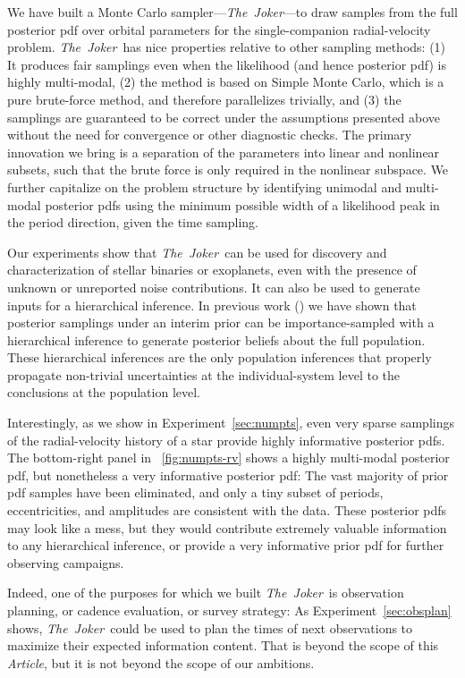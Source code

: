 \documentclass[manuscript, letterpaper]{aastex6}
\newcommand{\project}[1]{\textsl{#1}}
\newcommand{\samplername}{\project{The~Joker}}
\newcommand{\documentname}{\textsl{Article}}
\begin{document}
We have built a Monte Carlo sampler---\samplername---to draw samples from the
full posterior pdf over orbital parameters for the single-companion
radial-velocity problem.
\samplername\ has nice properties relative to other sampling methods:
(1) It produces fair samplings even when the likelihood (and hence posterior
pdf) is highly multi-modal, (2) the method is based on Simple Monte Carlo, which
is a pure brute-force method, and therefore parallelizes trivially, and (3) the
samplings are guaranteed to be correct under the assumptions presented above
without the need for convergence or other diagnostic checks.
The primary innovation we bring is a separation of the parameters into linear
and nonlinear subsets, such that the brute force is only required in the
nonlinear subspace.
We further capitalize on the problem structure by identifying unimodal and
multi-modal posterior pdfs using the minimum possible width of a likelihood peak
in the period direction, given the time sampling.

Our experiments show that \samplername\ can be used for discovery and
characterization of stellar binaries or exoplanets, even with the presence of
unknown or unreported noise contributions.
It can also be used to generate inputs for a hierarchical inference.
In previous work (\citealt{hoggeccentricity, dfmexopop}) we have shown
that posterior samplings under an interim prior can be importance-sampled
with a hierarchical inference to generate posterior beliefs about the
full population.
These hierarchical inferences are the only population inferences
that properly propagate non-trivial uncertainties at the
individual-system level to the conclusions at the population level.

Interestingly, as we show in Experiment~\ref{sec:numpts}, even very sparse
samplings of the radial-velocity history of a star provide highly
informative posterior pdfs.
The bottom-right panel in \figurename~\ref{fig:numpts-rv} shows a highly
multi-modal posterior pdf, but nonetheless a very informative posterior pdf:
The vast majority of prior pdf samples have been eliminated, and
only a tiny subset of periods, eccentricities, and amplitudes are
consistent with the data.
These posterior pdfs may look like a mess, but they would contribute
extremely valuable information to any hierarchical inference, or
provide a very informative prior pdf for further observing campaigns.

Indeed, one of the purposes for which we built \samplername\ is
observation planning, or cadence evaluation, or survey strategy:
As Experiment~\ref{sec:obsplan} shows, \samplername\ could be used to plan the
times of next observations to maximize their expected information content.
That is beyond the scope of this \documentname, but it is not beyond the scope
of our ambitions.
\end{document}

